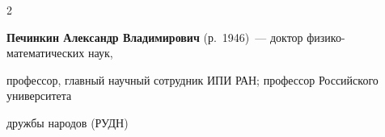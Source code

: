 \begin{multicols}{2}
























\vspace*{6pt}



\noindent

\textbf{Печинкин Александр Владимирович} (р.\ 1946)~--- доктор физико-математических наук,

профессор, главный научный сотрудник ИПИ РАН; профессор Российского университета

дружбы народов (РУДН)


















\end{multicols}
